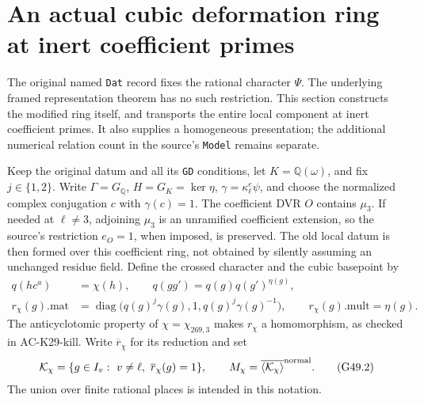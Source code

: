 \section{An actual cubic deformation ring at inert coefficient primes}
\label{sec:cubic-universal-model}

The original named \texttt{Dat} record fixes the rational
character $\Psi$.  The underlying framed representation theorem
has no such restriction.  This section constructs the modified
ring itself, and transports the entire local component at inert
coefficient primes.  It also supplies a homogeneous presentation;
the additional numerical relation count in the source's
\texttt{Model} remains separate.

Keep the original datum and all its \texttt{GD} conditions, let
$K=\mathbb Q(\omega)$, and fix $j\in\{1,2\}$.
Write $\Gamma=G_{\mathbb Q}$, $H=G_K=\ker\eta$,
$\gamma=\kappa_\ell^e\psi$, and choose the normalized
complex conjugation $c$ with $\gamma(c)=1$.
The coefficient DVR $O$ contains $\mu_3$.  If needed at
$\ell\ne3$, adjoining $\mu_3$ is an unramified coefficient
extension, so the source's restriction $e_O=1$, when imposed,
is preserved.  The old local datum is then formed over this
coefficient ring, not obtained by silently assuming an
unchanged residue field.
Define the crossed character and the cubic basepoint by
\[
 \begin{split}
 q(hc^a)&=\chi(h),\qquad
 q(gg')=q(g)q(g')^{\eta(g)},\\
 r_\chi(g).\mathrm{mat}
   &=\operatorname{diag}\bigl(q(g)^j\gamma(g),1,
                               q(g)^j\gamma(g)^{-1}\bigr),\qquad
 r_\chi(g).\mathrm{mult}=\eta(g).
 \end{split}                                                    \tag{G49.1}
\]
The anticyclotomic property of $\chi=\chi_{269,3}$ makes
$r_\chi$ a homomorphism, as checked in AC-K29-kill.
Write $\overline r_\chi$ for its reduction and set
\[
 \mathcal K_\chi=
 \{g\in I_v:\ v\ne\ell,\ \overline r_\chi(g)=1\},\qquad
 M_\chi=\overline{\langle\mathcal K_\chi\rangle}^{\rm normal}.
                                                                  \tag{G49.2}
\]
The union over finite rational places is intended in this notation.


